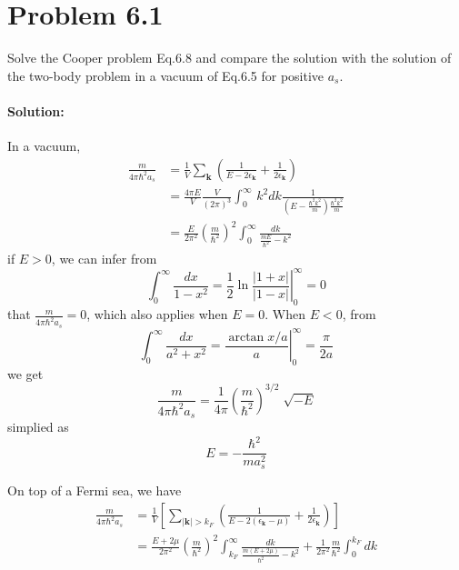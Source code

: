 \section*{Problem 6.1}
Solve the Cooper problem Eq.6.8 and compare the solution with the solution of the two-body problem in a vacuum of Eq.6.5 for positive $a_s$.
\paragraph*{Solution:}
In a vacuum, 
\begin{equation}
    \begin{aligned}
        \frac{m}{4\pi \hbar^2 a_s}
        & = \frac{1}{V} \sum_{\bm{k}} \left(\frac{1}{E - 2 \epsilon_{\bm{k}} } + \frac{1}{2 \epsilon_{\bm{k}}}\right)\\
        & =\frac{4\pi E}{V} \frac{V}{(2\pi)^3} \int_{0}^{\infty}  \,k^2 dk \frac{1}{\left(E - \frac{\hbar^2 k^2}{m}\right) \frac{\hbar^2 k^2}{m}} \\
        & = \frac{E}{2 \pi^2} \left(\frac{m}{\hbar^2}\right)^2
        \int_{0}^{\infty} \frac{dk}{\frac{mE}{\hbar^2} - k^2}
    \end{aligned}
\end{equation}
if $E>0$, we can infer from
\begin{equation}
    \int_{0}^{\infty} \frac{dx}{1 - x^2} 
    = \frac{1}{2} \left. \ln \frac{|1+x| }{|1-x| }\right \vert ^{\infty}_0
    = 0
\end{equation}
that $ \frac{m}{4\pi \hbar^2 a_s} = 0$, which also applies when $E = 0$.
When $E <0$, from
\begin{equation}
    \int_{0}^{\infty} \frac{dx}{a^2 + x^2}
    = \left.\frac{\arctan x/a}{a}\right \vert^{\infty}_0
    = \frac{\pi}{2a}
\end{equation}
we get
\begin{equation}
    \frac{m}{4\pi \hbar^2 a_s}
    = \frac{1}{4 \pi} \left(\frac{m}{\hbar^2}\right)^{3/2} \sqrt[]{-E}
\end{equation}
simplied as 
\begin{equation}
    E = - \frac{\hbar^2}{ma^2_s}
\end{equation}

On top of a Fermi sea, we have
\begin{equation}
    \begin{aligned}
        \frac{m}{4\pi \hbar^2 a_s}
        & = \frac{1}{V} \left[ \sum_{|\bm{k}| > k_F} \left(\frac{1}{E - 2 (\epsilon_{\bm{k}} - \mu) } + \frac{1}{2 \epsilon_{\bm{k}}}\right)\right] \\ 
        & = \frac{E+2\mu}{2\pi^2} \left(\frac{m}{\hbar^2}\right)^2
        \int_{k_F}^{\infty} \frac{dk}{\frac{m(E+2\mu)}{\hbar^2} - k^2}
        + \frac{1}{2\pi^2} \frac{m}{\hbar^2} \int_{0}^{k_F} dk
    \end{aligned}
\end{equation}

